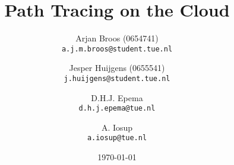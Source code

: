 \title{Path Tracing on the Cloud}
\date{\today}
\author{Arjan Broos (0654741) \\ \texttt{a.j.m.broos@student.tue.nl}
    \and Jesper Huijgens (0655541) \\ \texttt{j.huijgens@student.tue.nl}
    \and D.H.J. Epema \\ \texttt{d.h.j.epema@tue.nl}
    \and A. Iosup \\ \texttt{a.iosup@tue.nl}}
\maketitle
